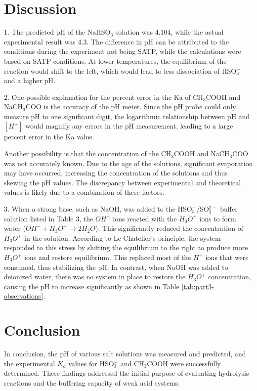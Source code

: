 \documentclass{article}
\begin{document}
\newpage
\section*{Discussion}

1. The predicted pH of the NaHSO$_3$ solution was 4.104, while the actual experimental result was 4.3. The difference in pH can be attributed to the conditions during the experiment not being SATP, while the calculations were based on SATP conditions. At lower temperatures, the equilibrium of the reaction would shift to the left, which would lead to less dissociation of HSO$_3^-$ and a higher pH. 

2. One possible explanation for the percent error in the Ka of CH$_3$COOH and NaCH$_3$COO is the accuracy of the pH meter. Since the pH probe could only measure pH to one significant digit, the logarithmic relationship between pH and $[H^+]$ would magnify any errors in the pH measurement, leading to a large percent error in the Ka value. 

Another possibility is that the concentration of the CH$_3$COOH and NaCH$_3$COO was not accurately known. Due to the age of the solutions, significant evaporation may have occurred, increasing the concentration of the solutions and thus skewing the pH values. The discrepancy between experimental and theoretical values is likely due to a combination of these factors. 

3. When a strong base, such as NaOH, was added to the HSO$_3^-$/SO$_3^{2-}$ buffer solution listed in Table 3, the $OH^-$ ions reacted with the $H_3O^+$ ions to form water ($OH^- + H_3O^+ \rightarrow 2H_2O$). This significantly reduced the concentration of $H_3O^+$ in the solution. According to Le Chatelier's principle, the system responded to this stress by shifting the equilibrium to the right to produce more $H_3O^+$ ions and restore equilibrium. This replaced most of the $H^+$ ions that were consumed, thus stabilizing the pH. In contrast, when NaOH was added to deionized water, there was no system in place to restore the $H_3O^+$ concentration, causing the pH to increase significantly as shown in Table \ref{tab:part3-observations}.

\section*{Conclusion}
In conclusion, the pH of various salt solutions was measured and predicted, and the experimental $K_a$ values for HSO$_3^-$ and CH$_3$COOH were successfully determined. These findings addressed the initial purpose of evaluating hydrolysis reactions and the buffering capacity of weak acid systems.
\end{document}
